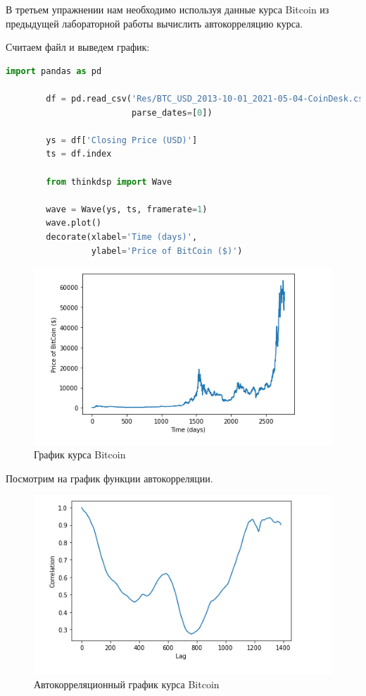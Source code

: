 \documentclass[a4paper, 14pt]{extarticle}
\begin{document}
    В третьем упражнении нам необходимо используя данные курса Bitcoin из предыдущей лабораторной работы вычислить автокорреляцию курса.

    Считаем файл и выведем график:

    \begin{lstlisting}[language=Python, caption= Считывание файла, label={lst:read_bitcoin}]
        import pandas as pd

        df = pd.read_csv('Res/BTC_USD_2013-10-01_2021-05-04-CoinDesk.csv',
                         parse_dates=[0])

        ys = df['Closing Price (USD)']
        ts = df.index

        from thinkdsp import Wave

        wave = Wave(ys, ts, framerate=1)
        wave.plot()
        decorate(xlabel='Time (days)',
                 ylabel='Price of BitCoin ($)')
    \end{lstlisting}

    \begin{figure}[H]
        \centering
        \includegraphics[width=0.8\linewidth]{bitcoin_wave}
        \caption{График курса Bitcoin}
        \label{fig:bitcoin_wave}
    \end{figure}

    Посмотрим на график функции автокорреляции.

    \begin{figure}[H]
        \centering
        \includegraphics[width=0.8\linewidth]{bitcoin_autocorr}
        \caption{Автокорреляционный график курса Bitcoin}
        \label{fig:bitcoin_autocorr}
    \end{figure}
\end{document}
